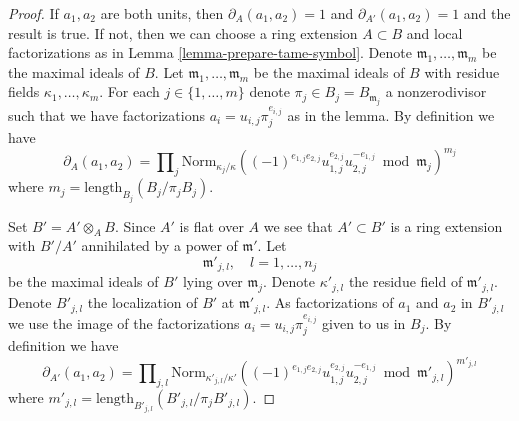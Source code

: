 \begin{proof}
If $a_1, a_2$ are both units, then $\partial_A(a_1, a_2) = 1$
and $\partial_{A'}(a_1, a_2) = 1$ and the result is true.
If not, then we can choose a ring extension $A \subset B$ and
local factorizations as in Lemma \ref{lemma-prepare-tame-symbol}.
Denote $\mathfrak m_1, \ldots, \mathfrak m_m$
be the maximal ideals of $B$. Let $\mathfrak m_1, \ldots, \mathfrak m_m$
be the maximal ideals of $B$ with residue fields $\kappa_1, \ldots, \kappa_m$.
For each $j \in \{1, \ldots, m\}$ denote $\pi_j \in B_j = B_{\mathfrak m_j}$
a nonzerodivisor such that we have factorizations
$a_i = u_{i, j}\pi_j^{e_{i, j}}$ as in the lemma.
By definition we have
$$
\partial_A(a_1, a_2) = \prod\nolimits_j
\text{Norm}_{\kappa_j/\kappa}
((-1)^{e_{1, j}e_{2, j}}u_{1, j}^{e_{2, j}}u_{2, j}^{-e_{1, j}}
\bmod \mathfrak m_j)^{m_j}
$$
where $m_j = \text{length}_{B_j}(B_j/\pi_j B_j)$.

\medskip\noindent
Set $B' = A' \otimes_A B$. Since $A'$ is flat over $A$ we see
that $A' \subset B'$ is a ring extension with $B'/A'$ annihilated
by a power of $\mathfrak m'$. Let
$$
\mathfrak m'_{j, l},\quad l = 1, \ldots, n_j
$$
be the maximal ideals of $B'$ lying over $\mathfrak m_j$. Denote
$\kappa'_{j, l}$ the residue field of $\mathfrak m'_{j, l}$. Denote
$B'_{j, l}$ the localization of $B'$ at $\mathfrak m'_{j, l}$.
As factorizations of $a_1$ and $a_2$ in $B'_{j, l}$
we use the image of the factorizations
$a_i = u_{i, j} \pi_j^{e_{i, j}}$ given to us in $B_j$.
By definition we have
$$
\partial_{A'}(a_1, a_2) = \prod\nolimits_{j, l}
\text{Norm}_{\kappa'_{j, l}/\kappa'}
((-1)^{e_{1, j}e_{2, j}}u_{1, j}^{e_{2, j}}u_{2, j}^{-e_{1, j}}
\bmod \mathfrak m'_{j, l})^{m'_{j, l}}
$$
where $m'_{j, l} = \text{length}_{B'_{j, l}}(B'_{j, l}/\pi_j B'_{j, l})$.


\end{proof}
